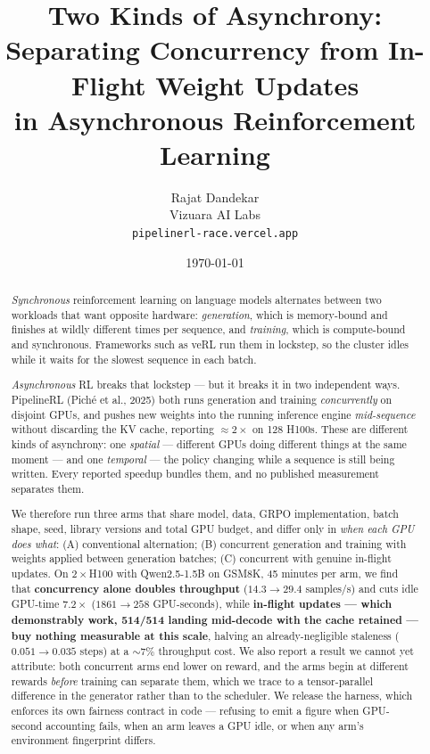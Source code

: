 \documentclass[11pt]{article}
\title{\textbf{Two Kinds of Asynchrony:\\ Separating Concurrency from In-Flight Weight
Updates\\ in Asynchronous Reinforcement Learning}}
\author{Rajat Dandekar\\ \small Vizuara AI Labs\\
\small \texttt{pipelinerl-race.vercel.app}}
\date{\today}
\begin{document}
\maketitle

\begin{abstract}
\noindent
\emph{Synchronous} reinforcement learning on language models alternates between two workloads
that want opposite hardware: \emph{generation}, which is memory-bound and finishes at wildly
different times per sequence, and \emph{training}, which is compute-bound and synchronous.
Frameworks such as veRL run them in lockstep, so the cluster idles while it waits for the
slowest sequence in each batch.

\emph{Asynchronous} RL breaks that lockstep --- but it breaks it in two independent ways.
PipelineRL (Piché et al., 2025) both runs generation and training \emph{concurrently} on
disjoint GPUs, and pushes new weights into the running inference engine \emph{mid-sequence}
without discarding the KV cache, reporting ${\approx}2\times$ on 128 H100s. These are
different kinds of asynchrony: one \emph{spatial} --- different GPUs doing different things at
the same moment --- and one \emph{temporal} --- the policy changing while a sequence is still
being written. Every reported speedup bundles them, and no published measurement separates
them.

We therefore run three arms that share model, data, GRPO
implementation, batch shape, seed, library versions and total GPU budget, and differ only in
\emph{when each GPU does what}: (A) conventional alternation; (B) concurrent generation and
training with weights applied between generation batches; (C) concurrent with genuine
in-flight updates. On $2\times$H100 with Qwen2.5-1.5B on GSM8K, 45 minutes per arm, we find
that \textbf{concurrency alone doubles throughput} ($14.3 \to 29.4$ samples/s) and cuts idle
GPU-time $7.2\times$ ($1861 \to 258$ GPU-seconds), while \textbf{in-flight updates --- which
demonstrably work, 514/514 landing mid-decode with the cache retained --- buy nothing
measurable at this scale}, halving an already-negligible staleness ($0.051 \to 0.035$ steps)
at a ${\sim}7\%$ throughput cost. We also report a result we cannot yet attribute: both
concurrent arms end lower on reward, and the arms begin at different rewards \emph{before}
training can separate them, which we trace to a tensor-parallel difference in the generator
rather than to the scheduler. We release the harness, which enforces its own fairness
contract in code --- refusing to emit a figure when GPU-second accounting fails, when an arm
leaves a GPU idle, or when any arm's environment fingerprint differs.
\end{abstract}
\end{document}
